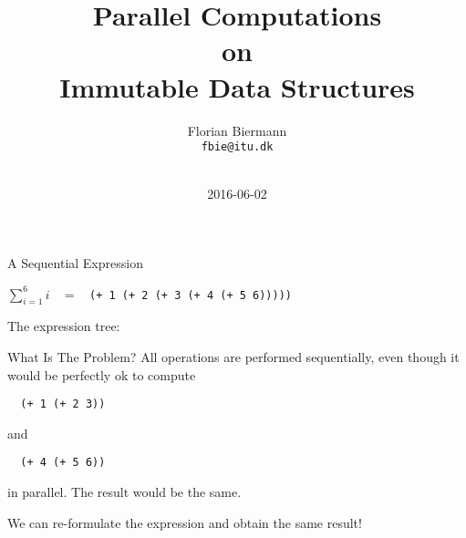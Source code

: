\documentclass{beamer}
\title{Parallel Computations\\ on\\ Immutable Data Structures}
\author{Florian Biermann \\\small{\texttt{fbie@itu.dk}} \\~}
\institute{IT University of Copenhagen \& UCAS}
\date{2016-06-02}
\begin{document}
\begin{frame}
  \titlepage{}
\end{frame}

\begin{frame}[fragile]{A Sequential Expression}
  \begin{center}
    $\sum_{i=1}^6 i$ ~ = ~ \lstinline{(+ 1 (+ 2 (+ 3 (+ 4 (+ 5 6)))))}
  \end{center}

  \pause{} \vspace{.5cm}

  The expression tree:

  \begin{center}
  \end{center}
\end{frame}

\begin{frame}[fragile]{What Is The Problem?}
All operations are performed sequentially, even though it would be perfectly ok to compute

\begin{lstlisting}
  (+ 1 (+ 2 3))
\end{lstlisting}

and

\begin{lstlisting}
  (+ 4 (+ 5 6))
\end{lstlisting}

in parallel. The result would be the same.

\pause{} \vspace{1cm}

We can re-formulate the expression and obtain the same result!
\end{frame}
\end{document}
